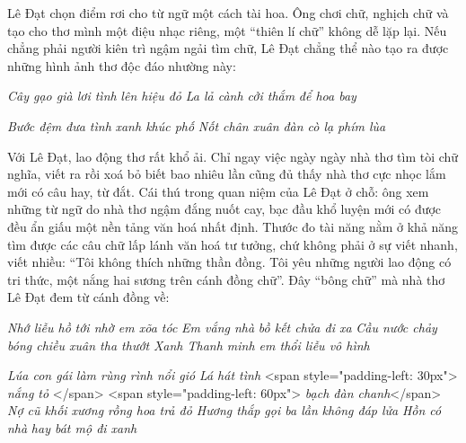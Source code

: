 \documentclass[../main.tex]{subfiles}
\begin{document}
\begin{multicols}{2}
Lê Đạt chọn điểm rơi cho từ ngữ một cách tài hoa. Ông chơi chữ, nghịch chữ và tạo cho thơ mình một điệu nhạc riêng, một “thiên lí chữ” không dễ lặp lại. Nếu chẳng phải người kiên trì ngậm ngải tìm chữ, Lê Đạt chẳng thể nào tạo ra được những hình ảnh thơ độc đáo nhường này: 
\begin{blockquote}
        
\textit{Cây gạo già         
lơi tình } 
\textit{lên hiệu đỏ}        
\textit{La lả cành         
cởi thắm } 
\textit{để hoa bay} 
        
\textit{Bước đệm }        
\textit{đưa tình }        
\textit{xanh khúc phố}        
\textit{Nốt chân xuân }        
\textit{đàn cò lạ } 
\textit{phím lùa} 

\end{blockquote}
 
Với Lê Đạt, lao động thơ rất khổ ải. Chỉ ngay việc ngày ngày nhà thơ tìm tòi chữ nghĩa, viết ra rồi xoá bỏ biết bao nhiêu lần cũng đủ thấy nhà thơ cực nhọc lắm mới có câu hay, từ đắt. Cái thú trong quan niệm của Lê Đạt ở chỗ: ông xem những từ ngữ do nhà thơ ngậm đắng nuốt cay, bạc đầu khổ luyện mới có được đều ẩn giấu một nền tảng văn hoá nhất định. Thước đo tài năng nằm ở khả năng tìm được các câu chữ lấp lánh văn hoá tư tưởng, chứ không phải ở sự viết nhanh, viết nhiều: “Tôi không thích những thần đồng. Tôi yêu những người lao động có tri thức, một nắng hai sương trên cánh đồng chữ”. Đây “bông chữ” mà nhà thơ Lê Đạt đem từ cánh đồng về:        
\begin{blockquote}
        
\textit{Nhớ liễu hồ }        
\textit{tới nhờ em xõa tóc}        
\textit{Em vắng nhà }        
\textit{bồ kết chửa đi xa}        
\textit{Cầu nước chảy }        
\textit{bóng chiều xuân tha thướt} 
\textit{Xanh Thanh minh em thổi liễu vô hình} 
        
\textit{Lúa con gái }        
\textit{làm rùng rình nổi gió} 
\textit{Lá hát tình} 
<span style="padding-left: 30px">\textit{       		nắng tỏ }</span> 
<span style="padding-left: 60px">\textit{        			bạch đàn chanh}</span>        
\textit{Nợ cũ khối xương rồng hoa trả đỏ        
Hương thắp gọi ba lần}        
\textit{không đáp lửa}        
\textit{Hồn có nhà} 
\textit{hay bát mộ đi xanh} 

\end{blockquote}
 

\end{multicols}
\end{document}
